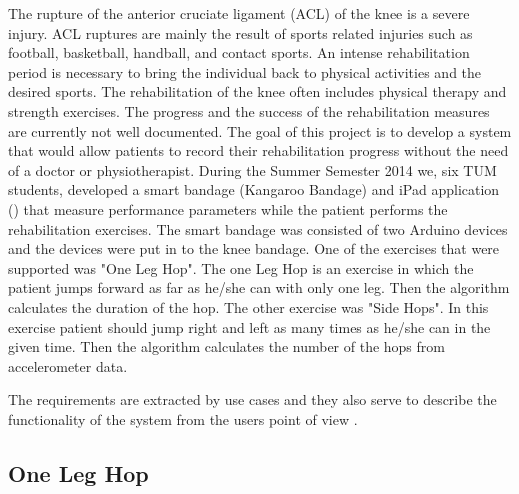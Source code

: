The rupture of the anterior cruciate ligament (ACL) of the knee is a severe injury. ACL ruptures are mainly the result of sports related injuries such as football, basketball, handball, and contact sports. An intense rehabilitation period is necessary to bring the individual back to physical activities and the desired sports. The rehabilitation of the knee often includes physical therapy and strength exercises. The progress and the success of the rehabilitation measures are currently not well documented. The goal of this project is to develop a system that would allow patients to record their rehabilitation progress without the need of a doctor or physiotherapist. During the Summer Semester 2014 we, six TUM students, developed a smart bandage (Kangaroo Bandage) and iPad application (\kneehapp) that measure performance parameters while the patient performs the rehabilitation exercises. The smart bandage was consisted of two Arduino devices and the devices were put in to the knee bandage. One of the exercises that were supported was "One Leg Hop". The one Leg Hop is an exercise in which the patient jumps forward as far as he/she can with only one leg. Then the algorithm calculates the duration of the hop. The other exercise was "Side Hops". In this exercise patient should jump right and left as many times as he/she can in the given time. Then the algorithm calculates the number of the hops from accelerometer data.



The requirements are extracted by use cases and they also serve to describe the functionality of the system from the users point of view \cite{Bruegge2004}.

\subsection{	One Leg Hop}

